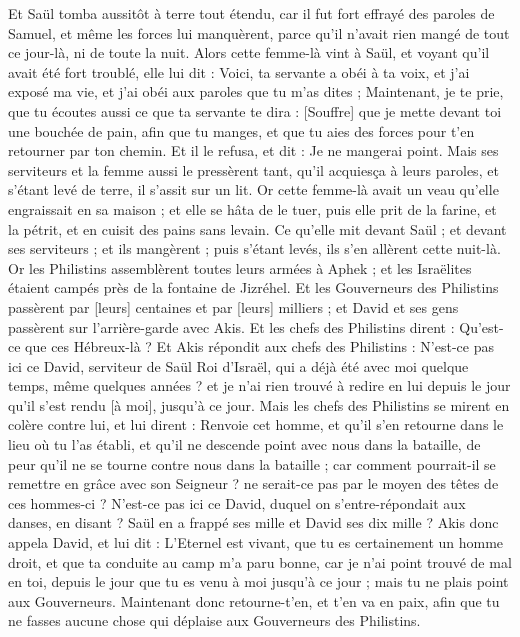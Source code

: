 \begin{multicols}{2}
Et Saül tomba aussitôt à terre tout étendu, car il fut fort effrayé des paroles de Samuel, et même les forces lui manquèrent, parce qu'il n'avait rien mangé de tout ce jour-là, ni de toute la nuit.
Alors cette femme-là vint à Saül, et voyant qu'il avait été fort troublé, elle lui dit : Voici, ta servante a obéi à ta voix, et j'ai exposé ma vie, et j'ai obéi aux paroles que tu m'as dites ;
Maintenant, je te prie, que tu écoutes aussi ce que ta servante te dira : [Souffre] que je mette devant toi une bouchée de pain, afin que tu manges, et que tu aies des forces pour t'en retourner par ton chemin.
Et il le refusa, et dit : Je ne mangerai point. Mais ses serviteurs et la femme aussi le pressèrent tant, qu'il acquiesça à leurs paroles, et s'étant levé de terre, il s'assit sur un lit.
Or cette femme-là avait un veau qu'elle engraissait en sa maison ; et elle se hâta de le tuer, puis elle prit de la farine, et la pétrit, et en cuisit des pains sans levain.
Ce qu'elle mit devant Saül ; et devant ses serviteurs ; et ils mangèrent ; puis s'étant levés, ils s'en allèrent cette nuit-là.
\VerseOne{}Or les Philistins assemblèrent toutes leurs armées à Aphek ; et les Israëlites étaient campés près de la fontaine de Jizréhel.
Et les Gouverneurs des Philistins passèrent par [leurs] centaines et par [leurs] milliers ; et David et ses gens passèrent sur l'arrière-garde avec Akis.
Et les chefs des Philistins dirent : Qu'est-ce que ces Hébreux-là ? Et Akis répondit aux chefs des Philistins : N'est-ce pas ici ce David, serviteur de Saül Roi d'Israël, qui a déjà été avec moi quelque temps, même quelques années ? et je n'ai rien trouvé à redire en lui depuis le jour qu'il s'est rendu [à moi], jusqu'à ce jour.
Mais les chefs des Philistins se mirent en colère contre lui, et lui dirent : Renvoie cet homme, et qu'il s'en retourne dans le lieu où tu l'as établi, et qu'il ne descende point avec nous dans la bataille, de peur qu'il ne se tourne contre nous dans la bataille ; car comment pourrait-il se remettre en grâce avec son Seigneur ? ne serait-ce pas par le moyen des têtes de ces hommes-ci ?
N'est-ce pas ici ce David, duquel on s'entre-répondait aux danses, en disant ? Saül en a frappé ses mille et David ses dix mille ?
Akis donc appela David, et lui dit : L'Eternel est vivant, que tu es certainement un homme droit, et que ta conduite au camp m'a paru bonne, car je n'ai point trouvé de mal en toi, depuis le jour que tu es venu à moi jusqu'à ce jour ; mais tu ne plais point aux Gouverneurs.
Maintenant donc retourne-t'en, et t'en va en paix, afin que tu ne fasses aucune chose qui déplaise aux Gouverneurs des Philistins.

\end{multicols}
